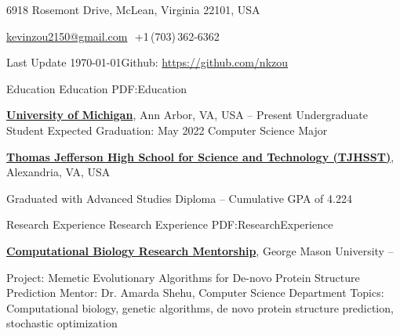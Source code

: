 \documentclass[letterpaper,MMMyyyy,nonstopmode]{style}
\newcommand{\CVAuthor}{Kevin Zou}
\newcommand{\CVNote}{Last Update \today}
\begin{document}

\Title{\CVAuthor}

\begin{SubTitle}
{6918 Rosemont Drive, McLean, Virginia 22101, USA}
\par
\href{mailto:kevinzou2150@gmail.com}{kevinzou2150@gmail.com}
\,\SubBulletSymbol\,+1\,(703)\,362-6362
\par
\CVNote \space \SubBulletSymbol \space Github: \href{https://github.com/nkzou}{https://github.com/nkzou}
\end{SubTitle}

\begin{Body}


\Section
{Education}
{Education}
{PDF:Education}

\Entry
\href{https://www.umich.edu/}
{\textbf{University of Michigan}},
Ann Arbor, VA, USA
\hfill
{} -- Present
\Gap
\BulletItem
Undergraduate Student
\hfill
Expected Graduation: May 2022
\BulletItem
Computer Science Major
\Gap

\Entry
\href{https://tjhsst.fcps.edu/}
{\textbf{Thomas Jefferson High School for Science and Technology (TJHSST)}},
Alexandria, VA, USA

\Gap
\BulletItem
Graduated with Advanced Studies Diploma
\hfill
{} --
\BulletItem
Cumulative GPA of 4.224



\Section
{Research Experience}
{Research Experience}
{PDF:ResearchExperience}

\Entry
\href{http://cs.gmu.edu/~ashehu/}
{\textbf{Computational Biology Research Mentorship}},
George Mason University
\hfill
{} -- 

\Gap
\BulletItem
Project:
Memetic Evolutionary Algorithms for De-novo Protein Structure Prediction
\BulletItem
Mentor:
Dr. Amarda Shehu, Computer Science Department
\BulletItem
Topics:
Computational biology, genetic algorithms, de novo protein structure prediction, stochastic optimization

\begin{comment}
\Section
{Publications}
{Publications}
{PDF:Publications}


\end{comment}
\end{Body}
\end{document}
